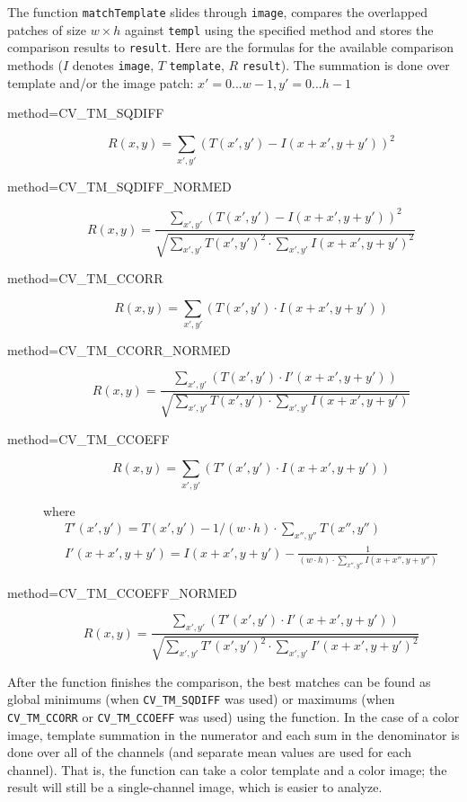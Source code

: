 \begin{description}
The function \texttt{matchTemplate} slides through \texttt{image}, compares the
overlapped patches of size $w \times h$ against \texttt{templ}
using the specified method and stores the comparison results to
\texttt{result}. Here are the formulas for the available comparison
methods ($I$ denotes \texttt{image}, $T$ \texttt{template},
$R$ \texttt{result}). The summation is done over template and/or the
image patch: $x' = 0...w-1, y' = 0...h-1$


\begin{description}
\item[method=CV\_TM\_SQDIFF]
\[ R(x,y)=\sum_{x',y'} (T(x',y')-I(x+x',y+y'))^2 \]

\item[method=CV\_TM\_SQDIFF\_NORMED]
\[ R(x,y)=\frac
{\sum_{x',y'} (T(x',y')-I(x+x',y+y'))^2}
{\sqrt{\sum_{x',y'}T(x',y')^2 \cdot \sum_{x',y'} I(x+x',y+y')^2}}
\]

\item[method=CV\_TM\_CCORR]
\[ R(x,y)=\sum_{x',y'} (T(x',y') \cdot I(x+x',y+y')) \]

\item[method=CV\_TM\_CCORR\_NORMED]
\[ R(x,y)=\frac
{\sum_{x',y'} (T(x',y') \cdot I'(x+x',y+y'))}
{\sqrt{\sum_{x',y'}T(x',y') \cdot \sum_{x',y'} I(x+x',y+y')}}
\]

\item[method=CV\_TM\_CCOEFF]
\[ R(x,y)=\sum_{x',y'} (T'(x',y') \cdot I(x+x',y+y')) \]

where
\[ 
\begin{array}{l}
T'(x',y')=T(x',y') - 1/(w \cdot h) \cdot \sum_{x'',y''} T(x'',y'')\\
I'(x+x',y+y')=I(x+x',y+y') - \frac{1}{(w \cdot h) \cdot \sum_{x'',y''} I(x+x'',y+y'')}
\end{array}
\]

\item[method=CV\_TM\_CCOEFF\_NORMED]
\[ R(x,y)=\frac
{ \sum_{x',y'} (T'(x',y') \cdot I'(x+x',y+y')) }
{ \sqrt{\sum_{x',y'}T'(x',y')^2 \cdot \sum_{x',y'} I'(x+x',y+y')^2} }
\]
\end{description}

After the function finishes the comparison, the best matches can be found as global minimums (when \texttt{CV\_TM\_SQDIFF} was used) or maximums (when \texttt{CV\_TM\_CCORR} or \texttt{CV\_TM\_CCOEFF} was used) using the  function. In the case of a color image, template summation in the numerator and each sum in the denominator is done over all of the channels (and separate mean values are used for each channel). That is, the function can take a color template and a color image; the result will still be a single-channel image, which is easier to analyze.



\end{description}
